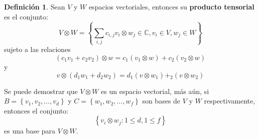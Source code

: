 \documentclass[12pt]{book}
\theoremstyle{definition}
\newtheorem{definition}[theorem]{Definición}
\newcounter{in}
\newcounter{ini}
\begin{document}
\begin{mdframed}
\begin{definition}
  Sean $V$ y $W$ espacios vectoriales, entonces su \textbf{producto
    tensorial} es el conjunto:
\begin{equation}
V \otimes W = \left \{ \sum_{i,j} c_{i,j} v_{i} \otimes w_{j} \in \mathbb{C}, v_{i} \in V, w_{j} \in W \right \}
\end{equation}
sujeto a las relaciones
\begin{equation}
(c_1v_1+c_2v_2) \otimes w = c_1(v_1 \otimes w) + c_2(v_2 \otimes w)
\end{equation}
y
\begin{equation}
v \otimes (d_1w_1+d_2w_2)= d_1(v \otimes w_1) + _2(v \otimes w_2)
\end{equation}
\end{definition}
Se puede demostrar que $V \otimes W$ es un espacio vectorial, más aún,
si $B = \left \{ v_1, v_2, \ldots, v_d \right \}$ y
$C = \left \{ w_1, w_2, \ldots, w_f \right \}$ son bases de $V$ y $W$
respectivamente, entonces el conjunto:
\begin{equation}
\left \{ v_i \otimes w_j: 1 \leq d, 1 \leq f \right \}
\end{equation}
es una base para $V \otimes W$.


\end{mdframed}
\end{document}
